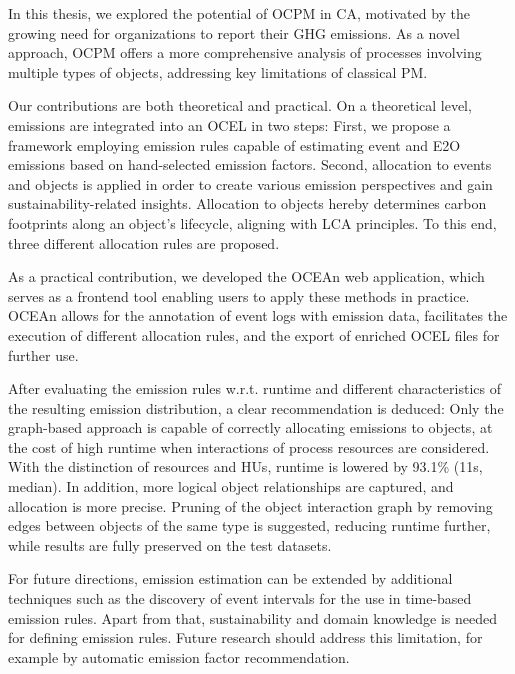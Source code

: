 
In this thesis, we explored the potential of OCPM in CA, motivated by the growing need for organizations to report their GHG emissions.
As a novel approach, OCPM offers a more comprehensive analysis of processes involving multiple types of objects, addressing key limitations of classical PM.

Our contributions are both theoretical and practical.
On a theoretical level, emissions are integrated into an OCEL in two steps:
First, we propose a framework employing emission rules capable of estimating event and E2O emissions based on hand-selected emission factors.
Second, allocation to events and objects is applied in order to create various emission perspectives and gain sustainability-related insights.
Allocation to objects hereby determines carbon footprints along an object's lifecycle, aligning with LCA principles.
To this end, three different allocation rules are proposed.

As a practical contribution, we developed the OCEAn web application,
which serves as a frontend tool enabling users to apply these methods in practice.
OCEAn allows for the annotation of event logs with emission data, facilitates the execution of different allocation rules, and the export of enriched OCEL files for further use.


After evaluating the emission rules w.r.t. runtime and different characteristics of the resulting emission distribution,
a clear recommendation is deduced:
Only the graph-based approach is capable of correctly allocating emissions to objects,
at the cost of high runtime when interactions of process resources are considered.
With the distinction of resources and HUs,
runtime is lowered by 93.1\% (11s, median).
In addition, more logical object relationships are captured, and allocation is more precise.
Pruning of the object interaction graph by removing edges between objects of the same type is suggested, reducing runtime further, while results are fully preserved on the test datasets.

For future directions, emission estimation can be extended by additional techniques such as the discovery of event intervals for the use in time-based emission rules.
Apart from that, sustainability and domain knowledge is needed for defining emission rules.
Future research should address this limitation, for example by automatic emission factor recommendation.

